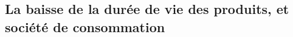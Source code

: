 \subsection{La baisse de la durée de vie des produits, et société de consommation}


\cite{etudedureedevie}
\cite{opSsg}